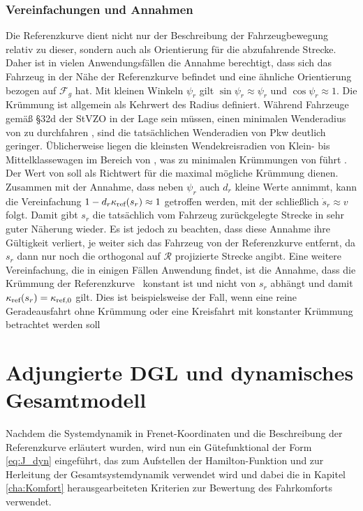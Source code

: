 \subsubsection{Vereinfachungen und Annahmen}\label{subsubsec:Vereinfachungen}
Die Referenzkurve dient nicht nur der Beschreibung der Fahrzeugbewegung relativ zu dieser, sondern auch als Orientierung für die abzufahrende Strecke. Daher ist in vielen Anwendungsfällen die Annahme berechtigt, dass sich das Fahrzeug in der Nähe der Referenzkurve befindet und eine ähnliche Orientierung bezogen auf $\mathcal{F}_g$ hat. Mit kleinen Winkeln $\psi_r$ gilt $\sin{\psi_r}\approx\psi_r$ und $\cos{\psi_r}\approx 1$. Die Krümmung ist allgemein als Kehrwert des Radius definiert. Während Fahrzeuge gemäß §32d der \gls{StVZO} in der Lage sein müssen, einen minimalen Wenderadius von  zu durchfahren \cite{StVZO.2012}, sind die tatsächlichen Wenderadien von Pkw deutlich geringer. Üblicherweise liegen die kleinsten Wendekreisradien von Klein- bis Mittelklassewagen im Bereich von , was zu minimalen Krümmungen von  führt \cite{auto.de.2011}. Der Wert von  soll als Richtwert für die maximal mögliche Krümmung dienen. Zusammen mit der Annahme, dass neben $\psi_r$ auch $d_r$ kleine Werte annimmt, kann die Vereinfachung $1-d_r\kappa_{\textrm{ref}}(s_r)\approx 1$ getroffen werden, mit der schließlich $\dot{s}_r\approx v$ folgt. Damit gibt $s_r$ die tatsächlich vom Fahrzeug zurückgelegte Strecke in sehr guter Näherung wieder. Es ist jedoch zu beachten, dass diese Annahme ihre Gültigkeit verliert, je weiter sich das Fahrzeug von der Referenzkurve entfernt, da $s_r$ dann nur noch die orthogonal auf $\mathcal{R}$ projizierte Strecke angibt. Eine weitere Vereinfachung, die in einigen Fällen Anwendung findet, ist die Annahme, dass die Krümmung der Referenzkurve \kapparefofs~konstant ist und nicht von $s_r$ abhängt und damit $\kappa_{\textrm{ref}}(s_r)=\kappa_{\textrm{ref},0}$ gilt. Dies ist beispielsweise der Fall, wenn eine reine Geradeausfahrt ohne Krümmung oder eine Kreisfahrt mit konstanter Krümmung betrachtet werden soll

\section{Adjungierte \gls{DGL} und dynamisches Gesamtmodell}\label{sec:Systemdynamik}
Nachdem die Systemdynamik in Frenet-Koordinaten und die Beschreibung der Referenzkurve erläutert wurden, wird nun ein Gütefunktional der Form \eqref{eq:J_dyn} eingeführt, das zum Aufstellen der Hamilton-Funktion und zur Herleitung der Gesamtsystemdynamik verwendet wird und dabei die in Kapitel \ref{cha:Komfort} herausgearbeiteten Kriterien zur Bewertung des Fahrkomforts verwendet.

